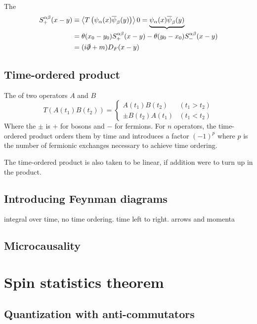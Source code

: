 \begin{definition}
The 
\begin{align*}
S^{\alpha\beta}_+(x-y) &\equiv \left\langle T \left(\psi_{\alpha}(x)\overline{\psi}_{\beta}(y)\right) \right\rangle{0} = \underbrace{\psi_{\alpha}(x)\overline{\psi}_{\beta}(y)} \\
&= \theta(x_0-y_0)S_+^{\alpha\beta}(x-y) - \theta(y_0-x_0)S^{\alpha\beta}_-(x-y) \\
&= (i\slashed{\partial}+m)D_F(x-y)
\end{align*}
\end{definition}


\subsection{Time-ordered product}
\begin{definition}
The  of two operators $A$ and $B$
\[ T \left(A(t_1)B(t_2)\right) = \begin{cases}
A(t_1)B(t_2) & (t_1 > t_2) \\
\pm B(t_2)A(t_1) & (t_1 < t_2)
\end{cases} \]
Where the $\pm$ is $+$ for bosons and $-$ for fermions. For $n$ operators, the time-ordered product orders them by time and introduces a factor $(-1)^p$ where $p$ is the number of fermionic exchanges necessary to achieve time ordering.

The time-ordered product is also taken to be linear, if addition were to turn up in the product.
\end{definition}

\subsection{Introducing Feynman diagrams}
integral over time, no time ordering. time left to right. arrows and momenta

\subsection{Microcausality}

\section{Spin statistics theorem}
\subsection{Quantization with anti-commutators}


